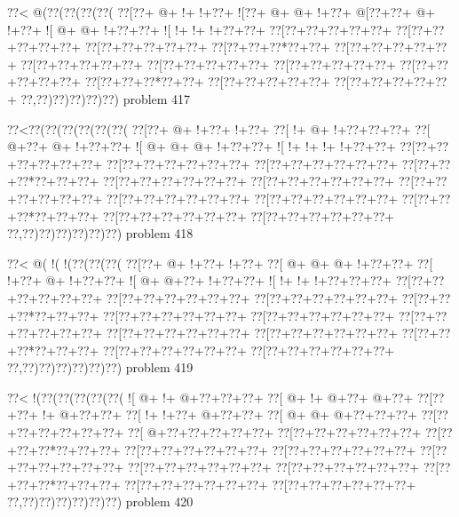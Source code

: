\vbox{\vbox{\goo
\0??<\- @(\0??(\0??(\0??(\0??(
\0??[\0??+\- @+\- !+\- !+\0??+
\- ![\0??+\- @+\- @+\- !+\0??+
\- @[\0??+\0??+\- @+\- !+\0??+
\- ![\- @+\- @+\- !+\0??+\0??+
\- ![\- !+\- !+\- !+\0??+\0??+
\0??[\0??+\0??+\0??+\0??+\0??+
\0??[\0??+\0??+\0??+\0??+\0??+
\0??[\0??+\0??+\0??+\0??+\0??+
\0??[\0??+\0??+\0??*\0??+\0??+
\0??[\0??+\0??+\0??+\0??+\0??+
\0??[\0??+\0??+\0??+\0??+\0??+
\0??[\0??+\0??+\0??+\0??+\0??+
\0??[\0??+\0??+\0??+\0??+\0??+
\0??[\0??+\0??+\0??+\0??+\0??+
\0??[\0??+\0??+\0??*\0??+\0??+
\0??[\0??+\0??+\0??+\0??+\0??+
\0??[\0??+\0??+\0??+\0??+\0??+
\0??,\0??)\0??)\0??)\0??)\0??)
}
\hfil problem 417\hfil\break
}

\vbox{\vbox{\goo
\0??<\0??(\0??(\0??(\0??(\0??(\0??(
\0??[\0??+\- @+\- !+\0??+\- !+\0??+
\0??[\- !+\- @+\- !+\0??+\0??+\0??+
\0??[\- @+\0??+\- @+\- !+\0??+\0??+
\- ![\- @+\- @+\- @+\- !+\0??+\0??+
\- ![\- !+\- !+\- !+\- !+\0??+\0??+
\0??[\0??+\0??+\0??+\0??+\0??+\0??+
\0??[\0??+\0??+\0??+\0??+\0??+\0??+
\0??[\0??+\0??+\0??+\0??+\0??+\0??+
\0??[\0??+\0??+\0??*\0??+\0??+\0??+
\0??[\0??+\0??+\0??+\0??+\0??+\0??+
\0??[\0??+\0??+\0??+\0??+\0??+\0??+
\0??[\0??+\0??+\0??+\0??+\0??+\0??+
\0??[\0??+\0??+\0??+\0??+\0??+\0??+
\0??[\0??+\0??+\0??+\0??+\0??+\0??+
\0??[\0??+\0??+\0??*\0??+\0??+\0??+
\0??[\0??+\0??+\0??+\0??+\0??+\0??+
\0??[\0??+\0??+\0??+\0??+\0??+\0??+
\0??,\0??)\0??)\0??)\0??)\0??)\0??)
}
\hfil problem 418\hfil\break
}

\vbox{\vbox{\goo
\0??<\- @(\- !(\- !(\0??(\0??(\0??(
\0??[\0??+\- @+\- !+\0??+\- !+\0??+
\0??[\- @+\- @+\- @+\- !+\0??+\0??+
\0??[\- !+\0??+\- @+\- !+\0??+\0??+
\- ![\- @+\- @+\0??+\- !+\0??+\0??+
\- ![\- !+\- !+\- !+\0??+\0??+\0??+
\0??[\0??+\0??+\0??+\0??+\0??+\0??+
\0??[\0??+\0??+\0??+\0??+\0??+\0??+
\0??[\0??+\0??+\0??+\0??+\0??+\0??+
\0??[\0??+\0??+\0??*\0??+\0??+\0??+
\0??[\0??+\0??+\0??+\0??+\0??+\0??+
\0??[\0??+\0??+\0??+\0??+\0??+\0??+
\0??[\0??+\0??+\0??+\0??+\0??+\0??+
\0??[\0??+\0??+\0??+\0??+\0??+\0??+
\0??[\0??+\0??+\0??+\0??+\0??+\0??+
\0??[\0??+\0??+\0??*\0??+\0??+\0??+
\0??[\0??+\0??+\0??+\0??+\0??+\0??+
\0??[\0??+\0??+\0??+\0??+\0??+\0??+
\0??,\0??)\0??)\0??)\0??)\0??)\0??)
}
\hfil problem 419\hfil\break
}

\vbox{\vbox{\goo
\0??<\- !(\0??(\0??(\0??(\0??(\0??(
\- ![\- @+\- !+\- @+\0??+\0??+\0??+
\0??[\- @+\- !+\- @+\0??+\- @+\0??+
\0??[\0??+\0??+\- !+\- @+\0??+\0??+
\0??[\- !+\- !+\0??+\- @+\0??+\0??+
\0??[\- @+\- @+\- @+\0??+\0??+\0??+
\0??[\0??+\0??+\0??+\0??+\0??+\0??+
\0??[\- @+\0??+\0??+\0??+\0??+\0??+
\0??[\0??+\0??+\0??+\0??+\0??+\0??+
\0??[\0??+\0??+\0??*\0??+\0??+\0??+
\0??[\0??+\0??+\0??+\0??+\0??+\0??+
\0??[\0??+\0??+\0??+\0??+\0??+\0??+
\0??[\0??+\0??+\0??+\0??+\0??+\0??+
\0??[\0??+\0??+\0??+\0??+\0??+\0??+
\0??[\0??+\0??+\0??+\0??+\0??+\0??+
\0??[\0??+\0??+\0??*\0??+\0??+\0??+
\0??[\0??+\0??+\0??+\0??+\0??+\0??+
\0??[\0??+\0??+\0??+\0??+\0??+\0??+
\0??,\0??)\0??)\0??)\0??)\0??)\0??)
}
\hfil problem 420\hfil\break
}


